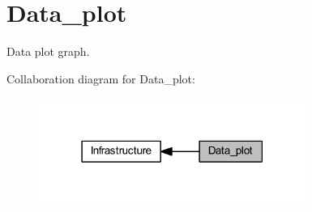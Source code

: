 \section{Data\+\_\+plot}
\label{group___data__plot}


Data plot graph.  


Collaboration diagram for Data\+\_\+plot\+:\nopagebreak
\begin{figure}[H]
\begin{center}
\leavevmode
\includegraphics[width=247pt]{group___data__plot}
\end{center}
\end{figure}
